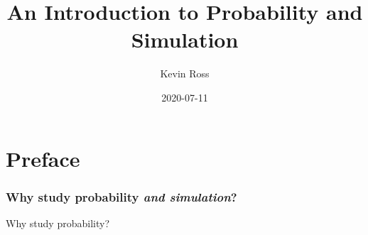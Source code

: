 \documentclass[
]{book}
\title{An Introduction to Probability and Simulation}
\author{Kevin Ross}
\date{2020-07-11}
\theoremstyle{definition}
\theoremstyle{definition}
\theoremstyle{definition}
\theoremstyle{remark}
\begin{document}
\maketitle

{
\setcounter{tocdepth}{1}
\tableofcontents
}
\hypertarget{preface}{%
\chapter*{Preface}\label{preface}}

\newcommand{\IP}{\textrm{P}}
\newcommand{\IQ}{\textrm{Q}}
\newcommand{\E}{\textrm{E}}
\newcommand{\Var}{\textrm{Var}}
\newcommand{\SD}{\textrm{SD}}
\newcommand{\Cov}{\textrm{Cov}}
\newcommand{\Corr}{\textrm{Corr}}
\newcommand{\Xbar}{\bar{X}}
\newcommand{\Ybar}{\bar{X}}
\newcommand{\xbar}{\bar{x}}
\newcommand{\ybar}{\bar{y}}
\newcommand{\ind}{\textrm{I}}
\newcommand{\dd}{\text{DDWDDD}}
\newcommand{\ep}{\epsilon}
\newcommand{\reals}{\mathbb{R}}



\hypertarget{why-study-probability-and-simulation}{%
\subsection*{\texorpdfstring{Why study probability \emph{and simulation}?}{Why study probability and simulation?}}\label{why-study-probability-and-simulation}}

Why study probability?
\end{document}
